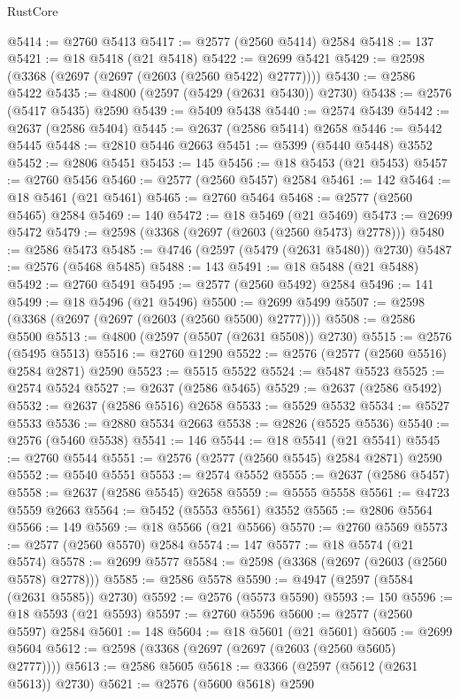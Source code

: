 \begin{lexlean}{RustCore}
\begin{coremodule}
@5414 := @2760 @5413
@5417 := @2577 (@2560 @5414) @2584
@5418 := 137
@5421 := @18 @5418 (@21 @5418)
@5422 := @2699 @5421
@5429 := @2598 (@3368 (@2697 (@2697 (@2603 (@2560 @5422) @2777))))
@5430 := @2586 @5422
@5435 := @4800 (@2597 (@5429 (@2631 @5430)) @2730)
@5438 := @2576 (@5417 @5435) @2590
@5439 := @5409 @5438
@5440 := @2574 @5439
@5442 := @2637 (@2586 @5404)
@5445 := @2637 (@2586 @5414) @2658
@5446 := @5442 @5445
@5448 := @2810 @5446 @2663
@5451 := @5399 (@5440 @5448) @3552
@5452 := @2806 @5451
@5453 := 145
@5456 := @18 @5453 (@21 @5453)
@5457 := @2760 @5456
@5460 := @2577 (@2560 @5457) @2584
@5461 := 142
@5464 := @18 @5461 (@21 @5461)
@5465 := @2760 @5464
@5468 := @2577 (@2560 @5465) @2584
@5469 := 140
@5472 := @18 @5469 (@21 @5469)
@5473 := @2699 @5472
@5479 := @2598 (@3368 (@2697 (@2603 (@2560 @5473) @2778)))
@5480 := @2586 @5473
@5485 := @4746 (@2597 (@5479 (@2631 @5480)) @2730)
@5487 := @2576 (@5468 @5485)
@5488 := 143
@5491 := @18 @5488 (@21 @5488)
@5492 := @2760 @5491
@5495 := @2577 (@2560 @5492) @2584
@5496 := 141
@5499 := @18 @5496 (@21 @5496)
@5500 := @2699 @5499
@5507 := @2598 (@3368 (@2697 (@2697 (@2603 (@2560 @5500) @2777))))
@5508 := @2586 @5500
@5513 := @4800 (@2597 (@5507 (@2631 @5508)) @2730)
@5515 := @2576 (@5495 @5513)
@5516 := @2760 @1290
@5522 := @2576 (@2577 (@2560 @5516) @2584 @2871) @2590
@5523 := @5515 @5522
@5524 := @5487 @5523
@5525 := @2574 @5524
@5527 := @2637 (@2586 @5465)
@5529 := @2637 (@2586 @5492)
@5532 := @2637 (@2586 @5516) @2658
@5533 := @5529 @5532
@5534 := @5527 @5533
@5536 := @2880 @5534 @2663
@5538 := @2826 (@5525 @5536)
@5540 := @2576 (@5460 @5538)
@5541 := 146
@5544 := @18 @5541 (@21 @5541)
@5545 := @2760 @5544
@5551 := @2576 (@2577 (@2560 @5545) @2584 @2871) @2590
@5552 := @5540 @5551
@5553 := @2574 @5552
@5555 := @2637 (@2586 @5457)
@5558 := @2637 (@2586 @5545) @2658
@5559 := @5555 @5558
@5561 := @4723 @5559 @2663
@5564 := @5452 (@5553 @5561) @3552
@5565 := @2806 @5564
@5566 := 149
@5569 := @18 @5566 (@21 @5566)
@5570 := @2760 @5569
@5573 := @2577 (@2560 @5570) @2584
@5574 := 147
@5577 := @18 @5574 (@21 @5574)
@5578 := @2699 @5577
@5584 := @2598 (@3368 (@2697 (@2603 (@2560 @5578) @2778)))
@5585 := @2586 @5578
@5590 := @4947 (@2597 (@5584 (@2631 @5585)) @2730)
@5592 := @2576 (@5573 @5590)
@5593 := 150
@5596 := @18 @5593 (@21 @5593)
@5597 := @2760 @5596
@5600 := @2577 (@2560 @5597) @2584
@5601 := 148
@5604 := @18 @5601 (@21 @5601)
@5605 := @2699 @5604
@5612 := @2598 (@3368 (@2697 (@2697 (@2603 (@2560 @5605) @2777))))
@5613 := @2586 @5605
@5618 := @3366 (@2597 (@5612 (@2631 @5613)) @2730)
@5621 := @2576 (@5600 @5618) @2590

\end{coremodule}
\end{lexlean}
